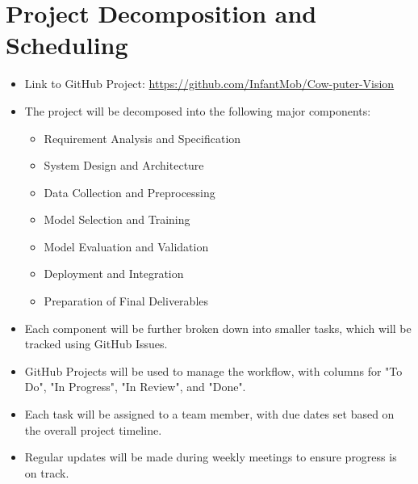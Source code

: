 \documentclass{article}
\begin{document}
\section{Project Decomposition and Scheduling}


\begin{itemize}
  \item Link to GitHub Project: \url{https://github.com/InfantMob/Cow-puter-Vision}
  \item The project will be decomposed into the following major components:
    \begin{itemize}
      \item Requirement Analysis and Specification
      \item System Design and Architecture
      \item Data Collection and Preprocessing 
      \item Model Selection and Training
      \item Model Evaluation and Validation
      \item Deployment and Integration
      \item Preparation of Final Deliverables
    \end{itemize}
  \item Each component will be further broken down into smaller tasks, which will be tracked using GitHub Issues.
  \item GitHub Projects will be used to manage the workflow, with columns for "To Do", "In Progress", "In Review", and "Done".
  \item Each task will be assigned to a team member, with due dates set based on the overall project timeline.
  \item Regular updates will be made during weekly meetings to ensure progress is on track.
\end{itemize}
\end{document}
